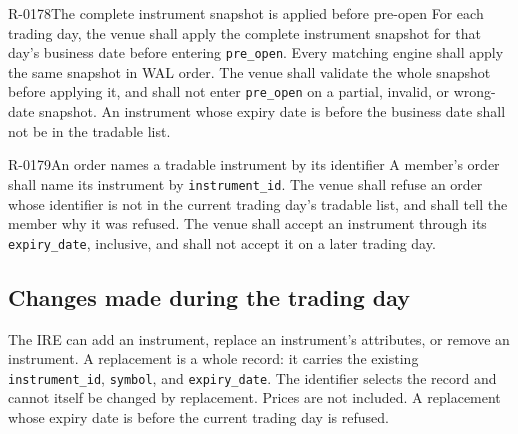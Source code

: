 \begin{requirement}{R-0178}{The complete instrument snapshot is applied before pre-open}
  For each trading day, the venue shall apply the complete instrument snapshot
  for that day's business date before entering \texttt{pre\_open}. Every
  matching engine shall apply the same snapshot in WAL order. The venue shall
  validate the whole snapshot before applying it, and shall not enter
  \texttt{pre\_open} on a partial, invalid, or wrong-date snapshot. An
  instrument whose expiry date is before the business date shall not be in the
  tradable list.
\end{requirement}

\begin{requirement}{R-0179}{An order names a tradable instrument by its identifier}
  A member's order shall name its instrument by \texttt{instrument\_id}.
  The venue shall refuse an order whose identifier is not in the current
  trading day's tradable list, and shall tell the member why it was refused.
  The venue shall accept an instrument through its \texttt{expiry\_date},
  inclusive, and shall not accept it on a later trading day.
\end{requirement}

\subsection{Changes made during the trading day}

The IRE can add an instrument, replace an instrument's attributes, or remove
an instrument. A replacement is a whole record: it carries the existing
\texttt{instrument\_id}, \texttt{symbol}, and \texttt{expiry\_date}. The
identifier selects the record and cannot itself be changed by replacement.
Prices are not included. A replacement whose expiry date is before the
current trading day is refused.

